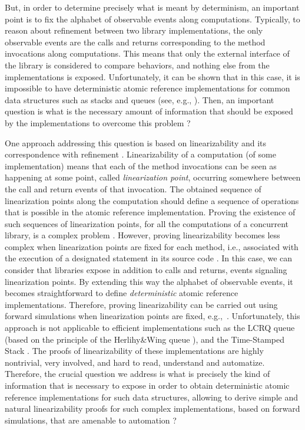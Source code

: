 But, in order to determine precisely what is meant by determinism, an important point is to fix the alphabet of observable events along computations. 
Typically, to reason about refinement between two library implementations, the only observable events are the calls and returns corresponding to the method invocations along computations. This means that only the external interface of the library is considered to compare behaviors, and nothing else from the implementations is exposed. Unfortunately, it can be shown that in this case, it is impossible to have deterministic atomic reference implementations for common data structures such as stacks and queues (see, e.g., \cite{DBLP:conf/cav/SchellhornWD12}). Then, an important question is what is the necessary amount of information that should be exposed by the implementations to overcome this problem ?

One approach addressing this question is based on linearizability \cite{journals/toplas/HerlihyW90} and its correspondence with refinement %
\cite{journals/tcs/FilipovicORY10,DBLP:conf/popl/BouajjaniEEH15}. Linearizability of a computation (of some implementation) means that each of the method invocations can be seen as happening at some point, called {\em linearization point}, occurring somewhere between the call and return events of that invocation. The obtained sequence of linearization points along the computation should define a sequence of operations that is possible in the atomic reference implementation. Proving the existence of such sequences of linearization points, for all the computations of a concurrent library, is a complex problem \cite{journals/iandc/AlurMP00,conf/esop/BouajjaniEEH13,DBLP:conf/netys/Hamza15}. 
%
However, proving linearizability becomes less complex when linearization points are fixed for each method, i.e., associated with the execution of a designated statement in its source code \cite{conf/esop/BouajjaniEEH13}. In this case, we can consider that libraries expose in addition to calls and returns, events signaling linearization points. By extending this way the alphabet of observable events, it becomes straightforward to define {\em deterministic} atomic reference implementations. Therefore, proving linearizability can be carried out using forward simulations when linearization points are fixed, e.g.,~\cite{conf/ppopp/VafeiadisHHS06,conf/cav/AmitRRSY07,conf/vmcai/Vafeiadis09,conf/tacas/AbdullaHHJR13}.
%
Unfortunately, this approach is not applicable to efficient implementations such as the LCRQ queue~\cite{DBLP:conf/ppopp/MorrisonA13} (based on the principle of the Herlihy\&Wing queue \cite{journals/toplas/HerlihyW90}), and the Time-Stamped Stack \cite{DBLP:conf/popl/DoddsHK15}. The proofs of linearizability of these implementations are highly nontrivial, very involved, and hard to read, understand and automatize. Therefore, the crucial question we address is what is precisely the kind of information that is necessary to expose in order to obtain deterministic atomic reference implementations for such data structures, allowing to derive simple and natural linearizability proofs for such complex implementations, based on forward simulations, that are amenable to automation ?

